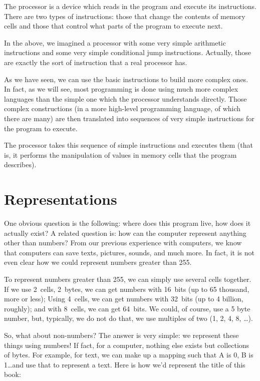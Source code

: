 The processor is a device which reads in the program and execute its
instructions. There are two types of instructions: those that change the
contents of memory cells and those that control what parts of the program to
execute next.

In the above, we imagined a processor with some very simple arithmetic
instructions and some very simple conditional jump instructions. Actually,
those are exactly the sort of instruction that a real processor has.

As we have seen, we can use the basic instructions to build more complex ones.
In fact, as we will see, most programming is done using much more complex
languages than the simple one which the processor understands directly. Those
complex constructions (in a more high-level programming language, of which
there are many) are then translated into sequences of very simple instructions
for the program to execute.

The processor takes this sequence of simple instructions and executes them
(that is, it performs the manipulation of values in memory cells that the
program describes).

\section{Representations}

One obvious question is the following: where does this program live, how does
it actually exist? A related question is: how can the computer represent
anything other than numbers? From our previous experience with computers, we
know that computers can save texts, pictures, sounds, and much more. In fact,
it is not even clear how we could represent numbers greater than 255.

To represent numbers greater than 255, we can simply use several cells
together. If we use 2~cells, 2~bytes, we can get numbers with 16~bits (up to 65
thousand, more or less); Using 4~cells, we can get numbers with 32~bits (up to
4 billion, roughly); and with 8~cells, we can get 64~bits. We could, of course,
use a 5 byte number, but, typically, we do not do that, we use multiples of two
(1, 2, 4, 8, \ldots).

So, what about non-numbers?  The answer is very simple: we represent these
things using numbers! If fact, for a computer, nothing else exists but
collections of bytes. For example, for text, we can make up a mapping such that
A is 0, B is 1\ldots and use that to represent a text. Here is how we'd
represent the title of this book:

